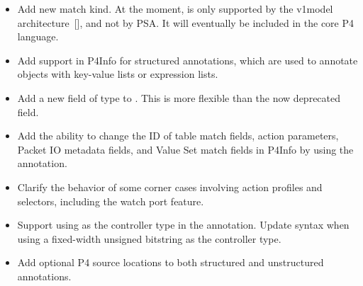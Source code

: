\documentclass[11pt]{article}
\begin{document}
{\begin{itemize}[noitemsep,topsep=\mdcompacttopsep]
\item{}Add new  match kind. At the moment,  is only supported by
the v1model architecture~[], and not by PSA. It will eventually be
included in the core P4 language.%

\item{}Add support in P4Info for structured annotations, which are used to annotate
objects with key-value lists or expression lists.%

\item{}Add a new  field of type  to . This is more
flexible than the now deprecated  field.%

\item{}Add the ability to change the ID of table match fields, action parameters,
Packet IO metadata fields, and Value Set match fields in P4Info by using the
 annotation.%

\item{}Clarify the behavior of some corner cases involving action profiles and
selectors, including the watch port feature.%

\item{}Support using  as the controller type in the 
annotation. Update syntax when using a fixed-width unsigned bitstring as the
controller type.%

\item{}Add optional P4 source locations to both structured and unstructured
annotations.%
\end{itemize}%

}
\end{document}
